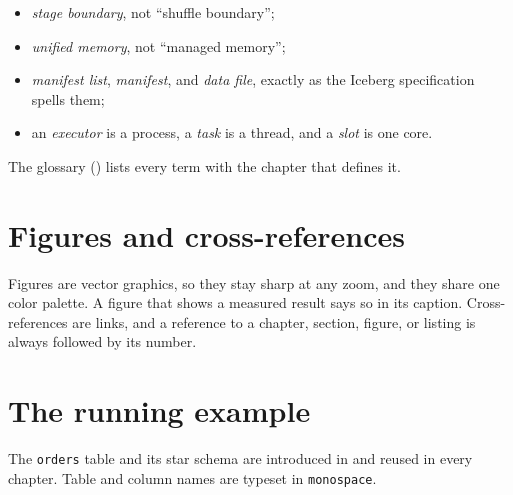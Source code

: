 \begin{itemize}
  \item \emph{stage boundary}, not ``shuffle boundary'';
  \item \emph{unified memory}, not ``managed memory'';
  \item \emph{manifest list}, \emph{manifest}, and \emph{data file}, exactly as the
  Iceberg specification spells them;
  \item an \emph{executor} is a process, a \emph{task} is a thread, and a
  \emph{slot} is one core.
\end{itemize}

The glossary () lists every term with the chapter that defines
it.

\section*{Figures and cross-references}

Figures are vector graphics, so they stay sharp at any zoom, and they share one
color palette. A figure that shows a measured result says so in its caption.
Cross-references are links, and a reference to a chapter, section, figure, or
listing is always followed by its number.

\section*{The running example}

The \texttt{orders} table and its star schema are introduced in 
and reused in every chapter. Table and column names are typeset in
\texttt{monospace}.
